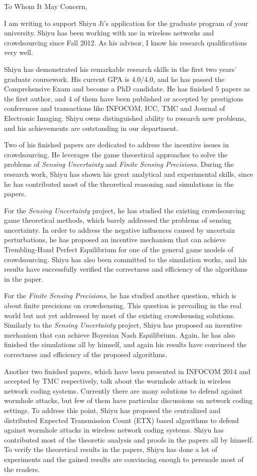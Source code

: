 \documentclass{letter}
\begin{document}
To Whom It May Concern,

I am writing to support Shiyu Ji's application for the graduate program of your university. Shiyu has been working with me in wireless networks and crowdsourcing since Fall 2012. As his advisor, I know his research qualifications very well.

Shiyu has demonstrated his remarkable research skills in the first two years' graduate coursework. His current GPA is 4.0/4.0, and he has passed the Comprehensive Exam and become a PhD candidate. He has finished 5 papers as the first author, and 4 of them have been published or accepted by prestigious conferences and transactions like INFOCOM, ICC, TMC and Journal of Electronic Imaging. Shiyu owns distinguished ability to research new problems, and his achievements are outstanding in our department.

Two of his finished papers are dedicated to address the incentive issues in crowdsourcing. He leverages the game theoretical approaches to solve the problems of \emph{Sensing Uncertainty} and \emph{Finite Sensing Precisions}. During the research work, Shiyu has shown his great analytical and experimental skills, since he has contributed most of the theoretical reasoning and simulations in the papers.

For the \emph{Sensing Uncertainty} project, he has studied the existing crowdsourcing game theoretical methods, which barely addressed the problems of sensing uncertainty. In order to address the negative influences caused by uncertain perturbations, he has proposed an incentive mechanism that can achieve Trembling-Hand Perfect Equilibrium for one of the general game models of crowdsourcing. Shiyu has also been committed to the simulation works, and his results have successfully verified the correctness and efficiency of the algorithms in the paper.

For the \emph{Finite Sensing Precisions}, he has studied another question, which is about finite precisions on crowdsensing. This question is prevailing in the real world but not yet addressed by most of the existing crowdsensing solutions. Similarly to the \emph{Sensing Uncertainty} project, Shiyu has proposed an incentive mechanism that can achieve Bayesian Nash Equilibrium. Again, he has also finished the simulations all by himself, and again his results have convinced the correctness and efficiency of the proposed algorithms.

Another two finished papers, which have been presented in INFOCOM 2014 and accepted by TMC respectively, talk about the wormhole attack in wireless network coding systems. Currently there are many solutions to defend against wormhole attacks, but few of them have particular discussions on network coding settings. To address this point, Shiyu has proposed the centralized and distributed Expected Transmission Count (ETX) based algorithms to defend against wormhole attacks in wireless network coding systems. Shiyu has contributed most of the theoretic analysis and proofs in the papers all by himself. To verify the theoretical results in the papers, Shiyu has done a lot of experiments and the gained results are convincing enough to persuade most of the readers.
\end{document}
